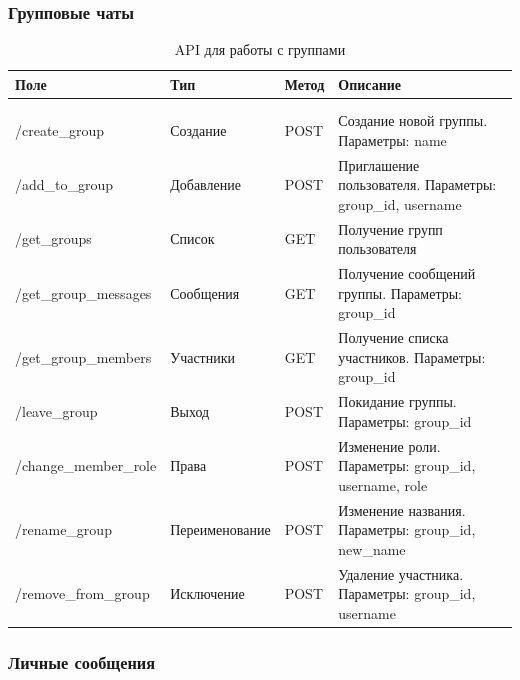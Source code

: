 \subsubsection{Групповые чаты}

\begin{xltabular}{\textwidth}{|l|l|p{1.7cm}|X|}
	\caption{API для работы с группами}\label{tab:groups_api} \\ \hline
	\centrow Поле & \centrow Тип & \centrow Метод & \centrow Описание \\ \hline
	 &  &  &  \\ \hline
	\endfirsthead
	 &  &  &  \\ \hline
	\finishhead
	/create\_group & Создание & POST & Создание новой группы. Параметры: name \\ \hline 
	/add\_to\_group & Добавление & POST & Приглашение пользователя. Параметры: group\_id, username \\ \hline 
	/get\_groups & Список & GET & Получение групп пользователя \\ \hline 
	/get\_group\_messages & Сообщения & GET & Получение сообщений группы. Параметры: group\_id \\ \hline 
	/get\_group\_members & Участники & GET & Получение списка участников. Параметры: group\_id \\ \hline 
	/leave\_group & Выход & POST & Покидание группы. Параметры: group\_id \\ \hline 
	/change\_member\_role & Права & POST & Изменение роли. Параметры: group\_id, username, role \\ \hline 
	/rename\_group & Переименование & POST & Изменение названия. Параметры: group\_id, new\_name \\ \hline 
	/remove\_from\_group & Исключение & POST & Удаление участника. Параметры: group\_id, username \\ \hline 
\end{xltabular}

\subsubsection{Личные сообщения}

